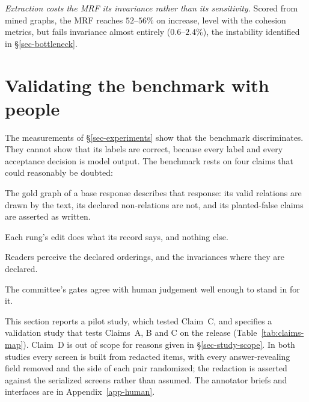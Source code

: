 \emph{Extraction costs the MRF its invariance rather than its sensitivity.} Scored from mined graphs, the MRF
reaches $52$--$56\%$ on increase, level with the cohesion metrics, but fails invariance almost entirely
($0.6$--$2.4\%$), the instability identified in \S\ref{sec-bottleneck}.

\section{Validating the benchmark with people}
\label{sec-human}

The measurements of \S\ref{sec-experiments} show that the benchmark discriminates. They cannot show that its labels
are correct, because every label and every acceptance decision is model output. The benchmark rests on four claims
that could reasonably be doubted:

\begin{description}[leftmargin=1.2em,itemsep=1pt,topsep=2pt,font=\normalfont\bfseries]
\item[A. Label validity.] The gold graph of a base response describes that response: its valid relations are
  drawn by the text, its declared non-relations are not, and its planted-false claims are asserted as written.
\item[B. Edit fidelity.] Each rung's edit does what its record says, and nothing else.
\item[C. Ordering validity.] Readers perceive the declared orderings, and the invariances where they are declared.
\item[D. Committee validity.] The committee's gates agree with human judgement well enough to stand in for it.
\end{description}

\noindent This section reports a pilot study, which tested Claim~C, and specifies a validation study that tests
Claims~A, B and C on the release (Table~\ref{tab:claims-map}). Claim~D is out of scope for reasons given in
\S\ref{sec-study-scope}. In both studies every screen is built from redacted items, with every answer-revealing
field removed and the side of each pair randomized; the redaction is asserted against the serialized screens
rather than assumed. The annotator briefs and interfaces are in Appendix~\ref{app-human}.

